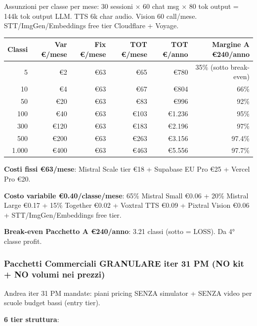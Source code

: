 \documentclass[12pt,a4paper]{article}
\begin{document}
Assunzioni per classe per mese: 30 sessioni × 60 chat msg × 80 tok output = 144k tok output LLM. TTS 6k char audio. Vision 60 call/mese. STT/ImgGen/Embeddings free tier Cloudflare + Voyage.

\begin{center}
\begin{tabular}{rrrrrr}
\toprule
\textbf{Classi} & \textbf{Var €/mese} & \textbf{Fix €/mese} & \textbf{TOT €/mese} & \textbf{TOT €/anno} & \textbf{Margine A €240/anno} \\
\midrule
5     & €2     & €63 & €65   & €780    & 35\% (sotto break-even) \\
10    & €4     & €63 & €67   & €804    & 66\% \\
50    & €20    & €63 & €83   & €996    & 92\% \\
100   & €40    & €63 & €103  & €1.236  & 95\% \\
300   & €120   & €63 & €183  & €2.196  & 97\% \\
500   & €200   & €63 & €263  & €3.156  & 97.4\% \\
1.000 & €400   & €63 & €463  & €5.556  & 97.7\% \\
\bottomrule
\end{tabular}
\end{center}

\textbf{Costi fissi €63/mese}: Mistral Scale tier €18 + Supabase EU Pro €25 + Vercel Pro €20.

\textbf{Costo variabile €0.40/classe/mese}: 65\% Mistral Small €0.06 + 20\% Mistral Large €0.17 + 15\% Together €0.02 + Voxtral TTS €0.09 + Pixtral Vision €0.06 + STT/ImgGen/Embeddings free tier.

\textbf{Break-even Pacchetto A €240/anno}: 3.21 classi (sotto = LOSS). Da 4° classe profit.

\subsubsection*{Pacchetti Commerciali GRANULARE iter 31 PM (NO kit + NO volumi nei prezzi)}

Andrea iter 31 PM mandate: piani pricing SENZA simulator + SENZA video per scuole budget bassi (entry tier).

\textbf{6 tier struttura}:
\end{document}
